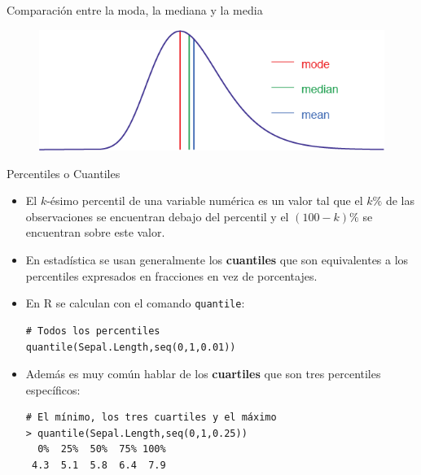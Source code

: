 \documentclass[handout]{beamer}
\begin{document}
\begin{frame}{Comparación entre la moda, la mediana y la media}
 
 \begin{figure}[h!]
	\centering
	\includegraphics[scale=0.5]{pics/centrales.png}
	
	
\end{figure}
 
\end{frame}







\begin{frame}[fragile]{Percentiles o Cuantiles}
\scriptsize{
\begin{itemize}
 \item El $k$-ésimo percentil de una variable numérica es un valor tal que el $k\%$ de las observaciones se encuentran debajo del percentil y el $(100-k)\%$ se encuentran sobre este valor.
 
 \item En estadística se usan generalmente los \textbf{cuantiles} que son equivalentes a los percentiles expresados en fracciones en vez de porcentajes.
 
 \item En R se calculan con el comando \verb+quantile+:
 \begin{verbatim}
# Todos los percentiles
quantile(Sepal.Length,seq(0,1,0.01))
 \end{verbatim}

 
 \item Además es muy común hablar de los \textbf{cuartiles} que son tres percentiles específicos: 
 
\begin{verbatim}
# El mínimo, los tres cuartiles y el máximo
> quantile(Sepal.Length,seq(0,1,0.25))
  0%  25%  50%  75% 100% 
 4.3  5.1  5.8  6.4  7.9  
\end{verbatim}

 
\end{itemize}

}

 
\end{frame}
\end{document}
